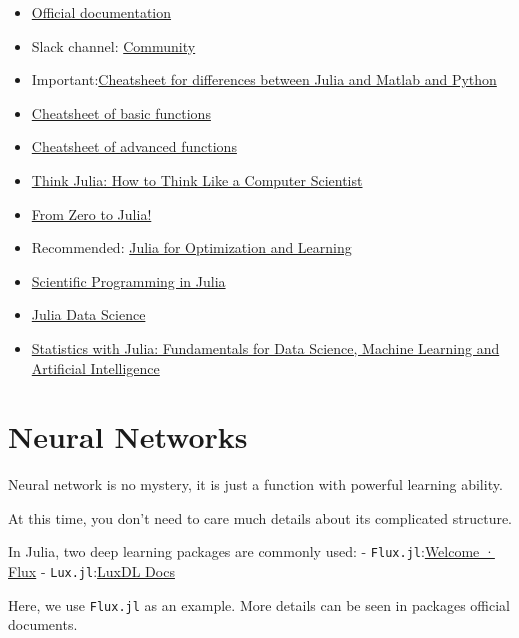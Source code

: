 \documentclass[
  letterpaper,
  DIV=11,
  numbers=noendperiod]{scrreport}
\providecommand{\tightlist}{%
  \setlength{\itemsep}{0pt}\setlength{\parskip}{0pt}}\usepackage{longtable,booktabs,array}
\begin{document}
\begin{itemize}
\tightlist
\item
  \href{https://docs.julialang.org/en/v1/}{Official documentation}
\item
  Slack channel: \href{https://julialang.org/community/}{Community}
\item
  Important:\href{https://cheatsheets.quantecon.org/}{Cheatsheet for
  differences between Julia and Matlab and Python}
\item
  \href{https://cheatsheets.quantecon.org/julia-cheatsheet.html}{Cheatsheet
  of basic functions}
\item
  \href{https://juliadocs.github.io/Julia-Cheat-Sheet/}{Cheatsheet of
  advanced functions}
\item
  \href{https://benlauwens.github.io/ThinkJulia.jl/latest/book.html\#chap01}{Think
  Julia: How to Think Like a Computer Scientist}
\item
  \href{https://techytok.com/from-zero-to-julia/}{From Zero to Julia!}
\item
  Recommended:
  \href{https://juliateachingctu.github.io/Julia-for-Optimization-and-Learning/stable/}{Julia
  for Optimization and Learning}
\item
  \href{https://juliateachingctu.github.io/Scientific-Programming-in-Julia/dev/}{Scientific
  Programming in Julia}
\item
  \href{https://juliadatascience.io/}{Julia Data Science}
\item
  \href{https://statisticswithjulia.org/}{Statistics with Julia:
  Fundamentals for Data Science, Machine Learning and Artificial
  Intelligence}
\end{itemize}


\chapter{Neural Networks}\label{neural-networks}

Neural network is no mystery, it is just a function with powerful
learning ability.

At this time, you don't need to care much details about its complicated
structure.

In Julia, two deep learning packages are commonly used: -
\texttt{Flux.jl}:\href{https://fluxml.ai/Flux.jl/stable/}{Welcome ·
Flux} - \texttt{Lux.jl}:\href{https://lux.csail.mit.edu/}{LuxDL Docs}

Here, we use \texttt{Flux.jl} as an example. More details can be seen in
packages official documents.
\end{document}
